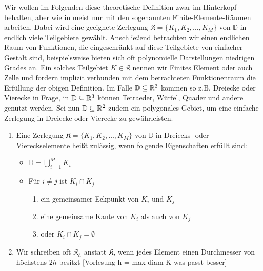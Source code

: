 Wir wollen im Folgenden diese theoretische Definition zwar im Hinterkopf behalten, aber wie in \cite{braess2013finite} meist nur mit den sogenannten Finite-Elemente-Räumen arbeiten. 
Dabei wird eine geeignete Zerlegung $\mathfrak{K} = \{K_1,K_2,\dots, K_M \}$ von $\mathbb{D}$ in endlich viele Teilgebiete gewählt. 
Anschließend betrachten wir einen endlichen Raum von Funktionen, die eingeschränkt auf diese Teilgebiete von einfacher Gestalt sind, beispielsweise bieten sich oft polynomielle Darstellungen niedrigen Grades an. 
Ein solches Teilgebiet $K \in \mathfrak{K}$ nennen wir Finites Element oder auch Zelle und fordern implizit verbunden mit dem betrachteten Funktionenraum die Erfüllung der obigen Definition. \newline
Im Falle $\mathbb{D} \subseteq \mathbb{R}^2$ kommen so z.B. Dreiecke oder Vierecke in Frage, in $\mathbb{D} \subseteq \mathbb{R}^3$ können Tetraeder, Würfel, Quader und andere genutzt werden. \newline
Sei nun $\mathbb{D} \subseteq \mathbb{R} ^2$ zudem ein polygonales Gebiet, um eine einfache Zerlegung in Dreiecke oder Vierecke zu gewährleisten.

\begin{Definition}
	\begin{enumerate}
		\item Eine Zerlegung $\mathfrak{K} = \{ K_1,K_2,\dots,K_M\}$ von $\mathbb{D}$ in Dreiecks- oder Viereckselemente heißt zulässig, wenn folgende Eigenschaften erfüllt sind:
		\begin{itemize}
			\item $\overline{\mathbb{D}} = \bigcup_{i=1}^M K_i$
			\item Für $i \neq j$ ist $K_i\cap K_j$
			\begin{enumerate}
				\item ein gemeinsamer Eckpunkt von $K_i$ und $K_j$
				\item eine gemeinsame Kante von $K_i$ als auch von $K_j$
				\item oder $K_i\cap K_j= \emptyset$
			\end{enumerate}
			
		\end{itemize}
		\item Wir schreiben oft $\mathfrak{K}_h$ anstatt $\mathfrak{K}$, wenn jedes Element einen Durchmesser von höchstens $2h$ besitzt [Vorlesung h = max diam K was passt besser]
	\end{enumerate}
\end{Definition}


